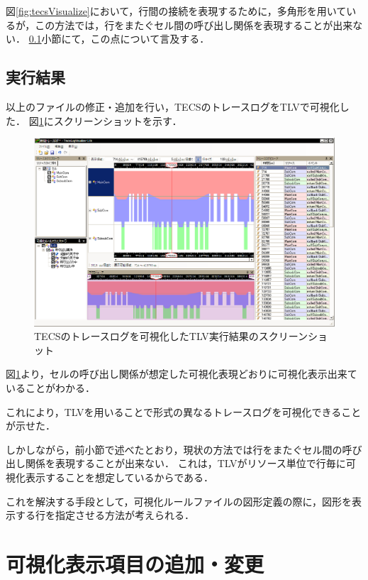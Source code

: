 図\ref{fig:tecsVisualize}において，行間の接続を表現するために，多角形を用いているが，この方法では，行をまたぐセル間の呼び出し関係を表現することが出来ない．
\ref{tecsRun}小節にて，この点について言及する．

\subsection{実行結果}
\label{tecsRun}

以上のファイルの修正・追加を行い，TECSのトレースログをTLVで可視化した．
図\ref{fig:tecsTLVscreenShot}にスクリーンショットを示す．

\begin{figure}[t]
\begin{center}
\includegraphics[width=15cm]{img/tecsTLVscreenShot.eps}
\caption{TECSのトレースログを可視化したTLV実行結果のスクリーンショット}
\label{fig:tecsTLVscreenShot}
\end{center}
\end{figure}

図\ref{fig:tecsTLVscreenShot}より，セルの呼び出し関係が想定した可視化表現どおりに可視化表示出来ていることがわかる．

これにより，TLVを用いることで形式の異なるトレースログを可視化できることが示せた．

しかしながら，前小節で述べたとおり，現状の方法では行をまたぐセル間の呼び出し関係を表現することが出来ない．
これは，TLVがリソース単位で行毎に可視化表示することを想定しているからである．

これを解決する手段として，可視化ルールファイルの図形定義の際に，図形を表示する行を指定させる方法が考えられる．



\section{可視化表示項目の追加・変更}

